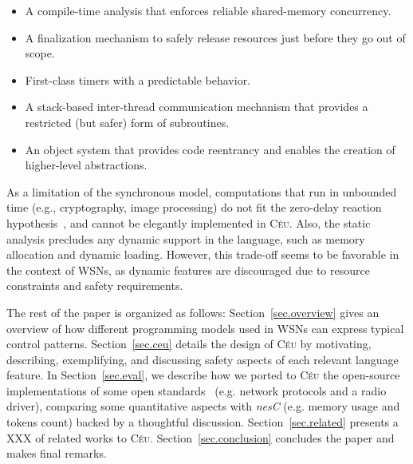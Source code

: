 \documentclass[10pt]{sensys-proc}
\newcommand{\CEU}{\textsc{C\'{e}u}\xspace}
\begin{document}
\begin{itemize}
\item A compile-time analysis that enforces reliable shared-memory concurrency.
\item A finalization mechanism to safely release resources just before they go 
      out of scope.
\item First-class timers with a predictable behavior.
\item A stack-based inter-thread communication mechanism that provides a 
      restricted (but safer) form of subroutines.
\item An object system that provides code reentrancy and enables the creation 
      of higher-level abstractions.
\end{itemize}

As a limitation of the synchronous model, computations that run in unbounded 
time (e.g., cryptography, image processing) do not fit the zero-delay reaction
hypothesis~\cite{rp.hypothesis}, and cannot be elegantly implemented in \CEU.
Also, the static analysis precludes any dynamic support in the language, such 
as memory allocation and dynamic loading.
However, this trade-off seems to be favorable in the context of WSNs, as 
dynamic features are discouraged due to resource constraints and safety 
requirements.

\begin{comment}
TODO

SAFETY, both react to time, what if they access memory, who executes first
CEU detects at compile time and raises a warning

Node-system-imperative
    - not macro
    - not declarative
    - drivers, protocols, control-intensive apps

Synchronous
    - not preemptive, actors

ED->MT->HC

Safety and expressiveness co-design

abstractions need to be first class
\end{comment}

The rest of the paper is organized as follows:
Section~\ref{sec.overview} gives an overview of how different programming 
models used in WSNs can express typical control patterns.
Section~\ref{sec.ceu} details the design of \CEU by motivating, describing, 
exemplifying, and discussing safety aspects of each relevant language feature.
In Section~\ref{sec.eval}, we describe how we ported to \CEU the open-source 
implementations of some open standards~\cite{wsn.teps} (e.g. network protocols 
and a radio driver),
comparing some quantitative aspects with \emph{nesC} (e.g. memory usage and 
tokens count) backed by a thoughtful discussion.
Section~\ref{sec.related} presents a XXX of related works to \CEU.
Section~\ref{sec.conclusion} concludes the paper and makes final remarks.
\end{document}
